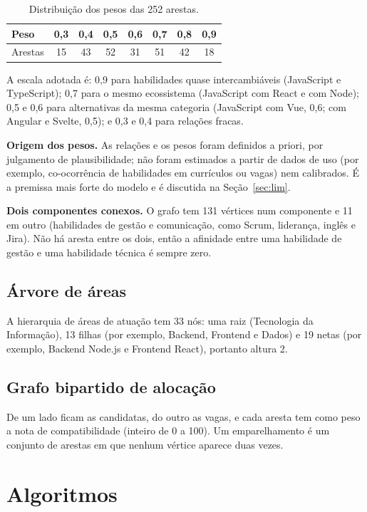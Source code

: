 \documentclass[12pt]{article}
\begin{document}
\begin{table}[ht]
\centering
\caption{Distribuição dos pesos das 252 arestas.}
\label{tab:pesos}
\begin{tabular}{lccccccc}
\hline
Peso & 0,3 & 0,4 & 0,5 & 0,6 & 0,7 & 0,8 & 0,9 \\
\hline
Arestas & 15 & 43 & 52 & 31 & 51 & 42 & 18 \\
\hline
\end{tabular}
\end{table}

A escala adotada é: 0,9 para habilidades quase intercambiáveis (JavaScript e TypeScript); 0,7 para o mesmo ecossistema (JavaScript com React e com Node); 0,5 e 0,6 para alternativas da mesma categoria (JavaScript com Vue, 0,6; com Angular e Svelte, 0,5); e 0,3 e 0,4 para relações fracas.

\textbf{Origem dos pesos.} As relações e os pesos foram definidos a priori, por julgamento de plausibilidade; não foram estimados a partir de dados de uso (por exemplo, co-ocorrência de habilidades em currículos ou vagas) nem calibrados. É a premissa mais forte do modelo e é discutida na Seção~\ref{sec:lim}.

\textbf{Dois componentes conexos.} O grafo tem 131 vértices num componente e 11 em outro (habilidades de gestão e comunicação, como Scrum, liderança, inglês e Jira). Não há aresta entre os dois, então a afinidade entre uma habilidade de gestão e uma habilidade técnica é sempre zero.

\subsection{Árvore de áreas}

A hierarquia de áreas de atuação tem 33 nós: uma raiz (Tecnologia da Informação), 13 filhas (por exemplo, Backend, Frontend e Dados) e 19 netas (por exemplo, Backend Node.js e Frontend React), portanto altura 2.

\subsection{Grafo bipartido de alocação}

De um lado ficam as candidatas, do outro as vagas, e cada aresta tem como peso a nota de compatibilidade (inteiro de 0 a 100). Um emparelhamento é um conjunto de arestas em que nenhum vértice aparece duas vezes.

\section{Algoritmos}
\label{sec:alg}
\end{document}
